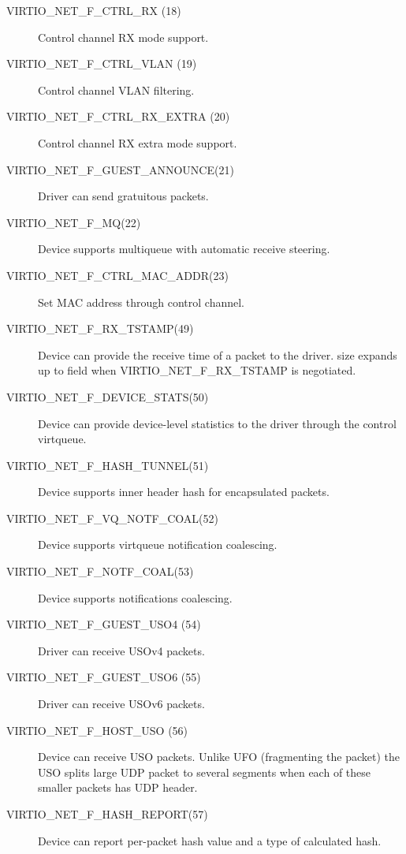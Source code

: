 \begin{description}
\item[VIRTIO_NET_F_CTRL_RX (18)] Control channel RX mode support.

\item[VIRTIO_NET_F_CTRL_VLAN (19)] Control channel VLAN filtering.

\item[VIRTIO_NET_F_CTRL_RX_EXTRA (20)]	Control channel RX extra mode support.

\item[VIRTIO_NET_F_GUEST_ANNOUNCE(21)] Driver can send gratuitous
    packets.

\item[VIRTIO_NET_F_MQ(22)] Device supports multiqueue with automatic
    receive steering.

\item[VIRTIO_NET_F_CTRL_MAC_ADDR(23)] Set MAC address through control
    channel.

\item[VIRTIO_NET_F_RX_TSTAMP(49)] Device can provide the receive time of a
    packet to the driver.  size expands up to
    field  when VIRTIO_NET_F_RX_TSTAMP is negotiated.

\item[VIRTIO_NET_F_DEVICE_STATS(50)] Device can provide device-level statistics
    to the driver through the control virtqueue.

\item[VIRTIO_NET_F_HASH_TUNNEL(51)] Device supports inner header hash for encapsulated packets.

\item[VIRTIO_NET_F_VQ_NOTF_COAL(52)] Device supports virtqueue notification coalescing.

\item[VIRTIO_NET_F_NOTF_COAL(53)] Device supports notifications coalescing.

\item[VIRTIO_NET_F_GUEST_USO4 (54)] Driver can receive USOv4 packets.

\item[VIRTIO_NET_F_GUEST_USO6 (55)] Driver can receive USOv6 packets.

\item[VIRTIO_NET_F_HOST_USO (56)] Device can receive USO packets. Unlike UFO
 (fragmenting the packet) the USO splits large UDP packet
 to several segments when each of these smaller packets has UDP header.

\item[VIRTIO_NET_F_HASH_REPORT(57)] Device can report per-packet hash
    value and a type of calculated hash.


\end{description}
